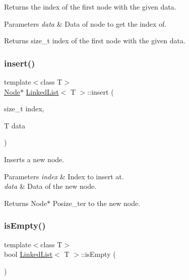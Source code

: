 Returns the index of the first node with the given data. 


\begin{DoxyParams}{Parameters}
{\em data} & Data of node to get the index of.\\
\hline
\end{DoxyParams}
\begin{DoxyReturn}{Returns}
size\+\_\+t index of the first node with the given data. 
\end{DoxyReturn}
\mbox{\label{classLinkedList_ae5e1ea8a9bbb18d9483db99b44479566}} 
\subsubsection{\texorpdfstring{insert()}{insert()}}
{\footnotesize\ttfamily template$<$class T$>$ \\
\hyperlink{structLinkedList_1_1Node}{Node}$\ast$ \hyperlink{classLinkedList}{Linked\+List}$<$ T $>$\+::insert (\begin{DoxyParamCaption}\item[{size\+\_\+t}]{index,  }\item[{T}]{data }\end{DoxyParamCaption})\hspace{0.3cm}{\ttfamily [inline]}}



Inserts a new node. 


\begin{DoxyParams}{Parameters}
{\em index} & Index to insert at. \\
\hline
{\em data} & Data of the new node.\\
\hline
\end{DoxyParams}
\begin{DoxyReturn}{Returns}
Node$\ast$ Posize\+\_\+ter to the new node. 
\end{DoxyReturn}
\mbox{\label{classLinkedList_a7ecbb28e82117a680839ed0dc28ebdce}} 
\subsubsection{\texorpdfstring{is\+Empty()}{isEmpty()}}
{\footnotesize\ttfamily template$<$class T$>$ \\
bool \hyperlink{classLinkedList}{Linked\+List}$<$ T $>$\+::is\+Empty (\begin{DoxyParamCaption}{ }\end{DoxyParamCaption})\hspace{0.3cm}{\ttfamily [inline]}}



